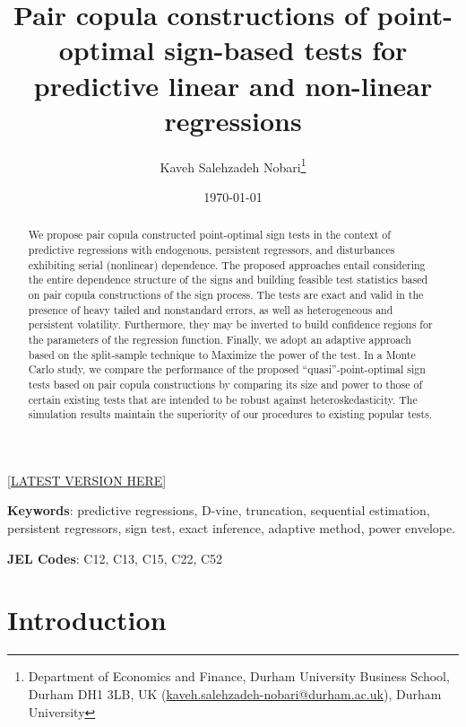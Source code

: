 \documentclass[harvard,11pt]{article}
\begin{document}
\title{{Pair copula constructions of point-optimal sign-based tests for predictive linear and non-linear regressions}}
\author{Kaveh Salehzadeh Nobari\thanks{%
Department of Economics and Finance, Durham University Business School, Durham DH1 3LB, UK
(\href{emailto: kaveh.salehzadeh-nobari@durham.ac.uk}{kaveh.salehzadeh-nobari@durham.ac.uk}), 
Durham University	}}
\date{\today}
\maketitle
\begin{center}
[\href{https://kavehsn.github.io/Job-Market-Paper/PCC_POS_2020.pdf}{\underline{LATEST VERSION HERE}}]
\end{center}


\begin{abstract}
We propose pair copula constructed point-optimal sign tests in the context of predictive regressions with endogenous, persistent regressors, and disturbances exhibiting serial (nonlinear) dependence. The proposed approaches entail considering the entire dependence structure of the signs and building feasible test statistics based on pair copula constructions of the sign process. The tests are exact and valid in the presence of heavy tailed and nonstandard errors, as well as heterogeneous and persistent volatility. Furthermore, they may be inverted to build confidence regions for the parameters of the regression function. Finally, we adopt an adaptive approach based on the split-sample technique to Maximize the power of the test. In a Monte Carlo study, we compare the performance of the proposed \textquotedblleft quasi\textquotedblright-point-optimal sign tests based on pair copula constructions by comparing its size and power to those of certain existing tests that are intended to be robust against heteroskedasticity. The simulation results maintain the superiority of our procedures to existing popular tests.   
\end{abstract}


\noindent \textbf{Keywords}: predictive regressions, D-vine, truncation, sequential estimation, persistent regressors, sign test, exact inference, adaptive method, power envelope.

\noindent \textbf{JEL Codes}: C12, C13, C15, C22, C52

\newpage
\section{Introduction \label{Introduction}}
\end{document}
